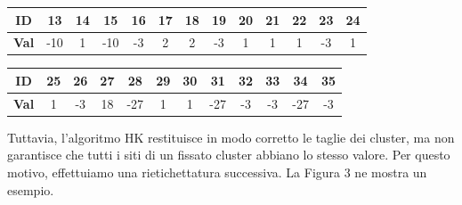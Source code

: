 \vspace{10px}
\noindent
\begin{tabular}{|c|*{12}{c|}}
	\hline
	\textbf{ID}   & 13 & 14 & 15 & 16 & 17 & 18 & 19 & 20 & 21 & 22 & 23 & 24 \\
	\hline
	\textbf{Val}  & -10 & 1 & -10 & -3 & 2 & 2 & -3 & 1 & 1 & 1 & -3 & 1 \\
	\hline
\end{tabular}

\vspace{10px}
\noindent
\begin{tabular}{|c|*{11}{c|}}
	\hline
	\textbf{ID}   & 25 & 26 & 27 & 28 & 29 & 30 & 31 & 32 & 33 & 34 & 35 \\
	\hline
	\textbf{Val}  & 1 & -3 & 18 & -27 & 1 & 1 & -27 & -3 & -3 & -27 & -3 \\
	\hline
\end{tabular}

\vspace{15px}
\noindent
Tuttavia, l’algoritmo HK restituisce in modo corretto le taglie dei cluster, ma non garantisce che tutti i siti di un fissato cluster abbiano lo stesso valore. Per questo motivo, effettuiamo una rietichettatura successiva. La Figura 3 ne mostra un esempio.

